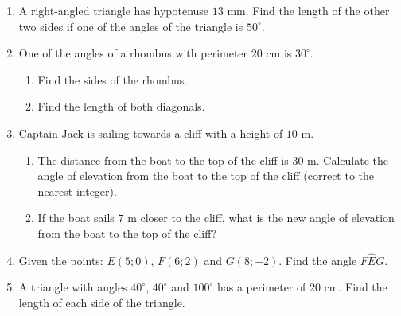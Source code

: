 \begin{eocexercises}{}
\begin{enumerate}[itemsep=6pt, label=\textbf{\arabic*}. ]
\item A right-angled triangle has hypotenuse $13$ mm. Find the length of the other two sides if one of the angles of the triangle is $50^{\circ}$.
\item One of the angles of a rhombus with perimeter $20$ cm is $30^{\circ}$. 
\begin{enumerate}[noitemsep, label=\textbf{(\alph*)} ]
\item Find the sides of the rhombus. 
\item Find the length of both diagonals. 
\end{enumerate} 
\item Captain Jack is sailing towards a cliff with a height of $10$ m. 
\begin{enumerate}[noitemsep, label=\textbf{(\alph*)} ] 
\item The distance from the boat to the top of the cliff is $30$ m. Calculate the angle of elevation from the boat to the top of the cliff (correct to the nearest integer).
\item If the boat sails $7$ m closer to the cliff, what is the new angle of elevation from the boat to the top of the cliff? 
\end{enumerate} 
\item Given the points: $E(5;0)$, $F(6;2)$ and $G(8;-2)$. Find the angle $F\hat{E}G$. 
\item  A triangle with angles $40^{\circ}$, $40^{\circ}$ and $100^{\circ}$ has a perimeter of $20$ cm. Find the length of each side of the triangle. 

\end{enumerate}
\end{eocexercises}
